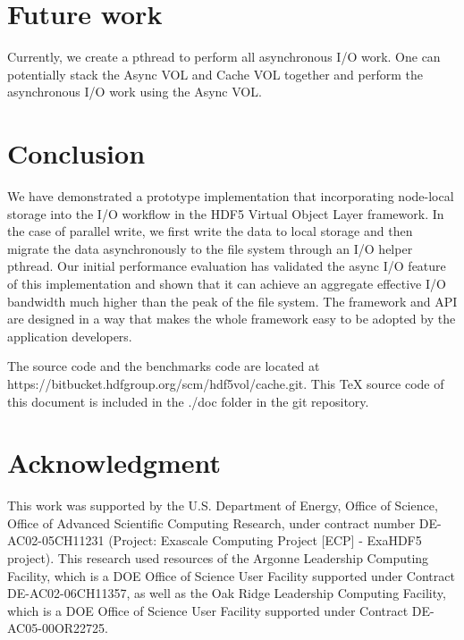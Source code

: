 \documentclass[aps, prb, 11pt, notitlepage]{revtex4-1}
\begin{document}
\section{Future work}
\label{sec:future}
Currently, we create a pthread to perform all asynchronous I/O work. One can potentially stack the Async VOL \cite{async_vol} and Cache VOL together and perform the asynchronous I/O work using the Async VOL. 

\section{Conclusion}
We have demonstrated a prototype implementation that incorporating node-local storage into the I/O workflow in the HDF5 Virtual Object Layer framework. In the case of parallel write, we first write the data to local storage and then migrate the data asynchronously to the file system through an I/O helper pthread. Our initial performance evaluation has validated the async I/O feature of this implementation and shown that it can achieve an aggregate effective I/O bandwidth much higher than the peak of the file system. The framework and API are designed in a way that makes the whole framework easy to be adopted by the application developers. 

The source code and the benchmarks code are located at \\https://bitbucket.hdfgroup.org/scm/hdf5vol/cache.git. This TeX source code of this document is included in the ./doc folder in the git repository. 
\section*{Acknowledgment}
This work was supported by the U.S. Department of Energy, Office of Science, Office of Advanced Scientific Computing Research, under contract number DE-AC02-05CH11231 (Project: Exascale Computing Project [ECP] - ExaHDF5 project). This research used resources of the Argonne Leadership Computing Facility, which is a DOE Office of Science User Facility supported under Contract DE-AC02-06CH11357, as well as the Oak Ridge Leadership Computing Facility, which is a DOE Office of Science User Facility supported under Contract DE-AC05-00OR22725.



\end{document}

